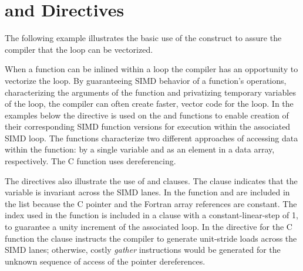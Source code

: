 \section{ and   Directives}
\label{sec:SIMD}

The following example illustrates the basic use of the  construct 
to assure the compiler that the loop can be vectorized.


 

When a function can be inlined within a loop the compiler has an opportunity to 
vectorize the loop. By guaranteeing SIMD behavior of a function's operations, 
characterizing the arguments of the function and privatizing temporary 
variables of the loop, the compiler can often create faster, vector code for 
the loop. In the examples below the   directive is 
used on the  and  functions to enable creation of their 
corresponding SIMD function versions for execution within the associated SIMD 
loop. The functions characterize two different approaches of accessing data 
within the function: by a single variable and as an element in a data array, 
respectively. The  C function uses dereferencing.

The   directives also illustrate the use of 
 and  clauses.  The  clause 
indicates that the variable  is invariant across the SIMD lanes. In 
the  function  and  are included in the  
list because the C pointer and the Fortran array references are constant.  The 
 index used in the  function is included in a  
clause with a constant-linear-step of 1, to guarantee a unity increment of the 
associated loop. In the   directive for the  
C function the   clause instructs the compiler to generate 
unit-stride loads across the SIMD lanes; otherwise,  costly \emph{gather} 
instructions would be generated for the unknown sequence of access of the 
pointer dereferences.

